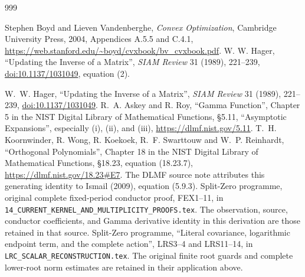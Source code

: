 \begin{thebibliography}{999}

 Stephen Boyd and Lieven Vandenberghe,
\emph{Convex Optimization}, Cambridge University Press, 2004,
Appendices A.5.5 and C.4.1,
\url{https://web.stanford.edu/~boyd/cvxbook/bv_cvxbook.pdf}.
 W. W. Hager, ``Updating the Inverse of a Matrix'',
\emph{SIAM Review} 31 (1989), 221--239,
\href{https://doi.org/10.1137/1031049}{doi:10.1137/1031049}, equation (2).

 W.~W. Hager, ``Updating the Inverse of a Matrix'',
\emph{SIAM Review} 31 (1989), 221--239,
\href{https://doi.org/10.1137/1031049}{doi:10.1137/1031049}.
 R.~A. Askey and R. Roy, ``Gamma Function'',
Chapter 5 in the NIST Digital Library of Mathematical Functions,
\S5.11, ``Asymptotic Expansions'', especially (i), (ii), and (iii),
\url{https://dlmf.nist.gov/5.11}.
 T.~H. Koornwinder, R. Wong, R. Koekoek,
R.~F. Swarttouw and W.~P. Reinhardt, ``Orthogonal Polynomials'',
Chapter 18 in the NIST Digital Library of Mathematical Functions,
\S18.23, equation (18.23.7),
\url{https://dlmf.nist.gov/18.23#E7}. The DLMF source note attributes
this generating identity to Ismail (2009), equation (5.9.3).
 Split-Zero programme, original complete
fixed-period conductor proof, FEX1--11, in
\texttt{14\_CURRENT\_KERNEL\_AND\_MULTIPLICITY\_PROOFS.tex}.
The observation, source, conductor coefficients, and Gamma derivative
identity in this derivation are those retained in that source.
 Split-Zero programme, ``Literal covariance,
logarithmic endpoint term, and the complete action'', LRS3--4 and
LRS11--14, in \texttt{LRC\_SCALAR\_RECONSTRUCTION.tex}.
The original finite root guards and complete lower-root norm estimates
are retained in their application above.


\end{thebibliography}
